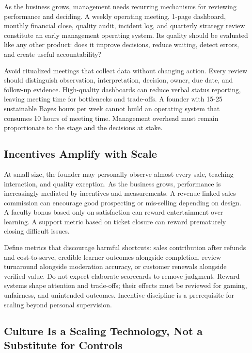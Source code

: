 As the business grows, management needs recurring mechanisms for reviewing performance and deciding. A weekly operating meeting, 1-page dashboard, monthly financial close, quality audit, incident log, and quarterly strategy review constitute an early management operating system. Its quality should be evaluated like any other product: does it improve decisions, reduce waiting, detect errors, and create useful accountability?

Avoid ritualized meetings that collect data without changing action. Every review should distinguish observation, interpretation, decision, owner, due date, and follow-up evidence. High-quality dashboards can reduce verbal status reporting, leaving meeting time for bottlenecks and trade-offs. A founder with 15-25 sustainable Bayes hours per week cannot build an operating system that consumes 10 hours of meeting time. Management overhead must remain proportionate to the stage and the decisions at stake.

\subsection{Incentives Amplify with Scale}
\label{sec:incentives_amplify_with_scale}

At small size, the founder may personally observe almost every sale, teaching interaction, and quality exception. As the business grows, performance is increasingly mediated by incentives and measurements. A revenue-linked sales commission can encourage good prospecting or mis-selling depending on design. A faculty bonus based only on satisfaction can reward entertainment over learning. A support metric based on ticket closure can reward prematurely closing difficult issues.

Define metrics that discourage harmful shortcuts: sales contribution after refunds and cost-to-serve, credible learner outcomes alongside completion, review turnaround alongside moderation accuracy, or customer renewals alongside verified value. Do not expect elaborate scorecards to remove judgment. Reward systems shape attention and trade-offs; their effects must be reviewed for gaming, unfairness, and unintended outcomes. Incentive discipline is a prerequisite for scaling beyond personal supervision.

\subsection{Culture Is a Scaling Technology, Not a Substitute for Controls}
\label{sec:culture_scaling_technology}


